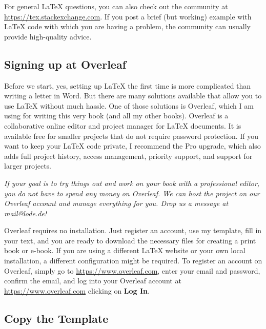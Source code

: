 For general LaTeX questions, you can also check out the community at \url{https://tex.stackexchange.com}. If you post a brief (but working) example with LaTeX code with which you are having a problem, the community can usually provide high-quality advice.


\subsection{Signing up at Overleaf}

Before we start, yes, setting up LaTeX the first time is more complicated than writing a letter in Word. But there are many solutions available that allow you to use LaTeX without much hassle. One of those solutions is Overleaf, which I am using for writing this very book (and all my other books). Overleaf is a collaborative online editor and project manager for LaTeX documents. It is available free for smaller projects that do not require password protection. If you want to keep your LaTeX code private, I recommend the Pro upgrade, which also adds full project history, access management, priority support, and support for larger projects. 

\textit{If your goal is to try things out and work on your book with a professional editor, you do not have to spend any money on Overleaf. We can host the project on our Overleaf account and manage everything for you. Drop us a message at mail@lode.de!}



Overleaf requires no installation. Just register an account, use my template, fill in your text, and you are ready to download the necessary files for creating a print book or e-book. If you are using a different LaTeX website or your own local installation, a different configuration might be required. To register an account on Overleaf, simply go to \url{https://www.overleaf.com}, enter your email and password, confirm the email, and log into your Overleaf account at \url{https://www.overleaf.com} clicking on \textbf{Log In}.


\subsection{Copy the Template}\label{copytemplate:sec}

